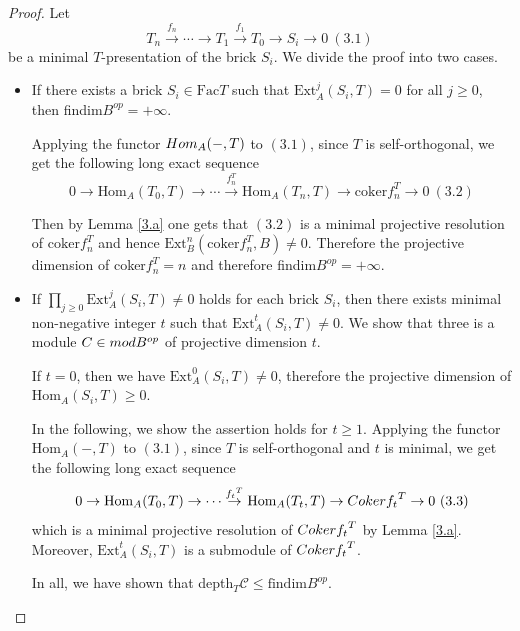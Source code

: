 \documentclass[10pt,a4paper]{amsart}
\begin{document}
\begin{proof}
 Let $$T_n \stackrel{f_n}{\to} \cdots \to T_1\stackrel{f_1} {\to} T_0 \to S_i \to 0\ (3.1)$$ be a minimal $T$-presentation of the brick $S_i$. We divide the proof into two cases.

\begin{itemize}
  \item [(1)] If there exists a brick $S_i \in \text{Fac}T$ such that $\text{Ext}^j_A (S_i, T) =0$ for all $j\geq 0$, then  findim$ B^{op}=+\infty$.

Applying the functor ${\rm Hom}_A(-, T)$ to $(3.1)$, since $T$ is self-orthogonal, we get the  following long exact sequence
$$0\to \text{Hom}_A(T_0, T)\to \cdots \xrightarrow{f_n^T} \text{Hom}_A(T_n, T)\to \text{coker} f_n ^T \to 0 \ (3.2)$$

\noindent Then by Lemma \ref{3.a} one gets that $(3.2)$ is a minimal projective resolution of $\text{coker} f_n ^T$ and hence $\text{Ext} _B^n (\text{coker}f_n^T, B) \neq 0$. Therefore the projective dimension of coker$f_n^T =n$ and therefore findim$B^{op}= +\infty.$

\item [(2)]  If $\prod _{j\geq 0}\text{Ext} _A^{j} (S_i, T) \neq 0$ holds for each brick $S_i$, then there exists minimal non-negative integer $t$ such that $\text{Ext}^t_A(S_i, T) \neq 0$. We show that three is a module $C\in {\rm mod}B^{op}$ of projective dimension $t$.

If $t=0$, then we have $\text{Ext}^0_A(S_i, T) \neq 0$, therefore the projective dimension of $\text{Hom}_A(S_i, T) \geq 0$.

In the following, we show the assertion holds for $t\geq1$. Applying the functor $\text{Hom}_A(-, T)$ to  $(3.1)$, since $T$ is self-orthogonal and $t$ is minimal, we get the following long exact sequence
$$0\to \text{Hom}_A(T_0, T)\to\cdots \stackrel{{f_t}^T}{\to} \text{Hom}_A(T_t, T)\to \textup{Coker}{f_t}^T \to 0\ (3.3)$$
 which is a minimal projective resolution of $\textup{Coker}{f_t}^T$ by Lemma \ref{3.a}. Moreover, $\text{Ext}^t_A(S_i, T)$ is a submodule of $\textup{Coker}{f_t}^T$. 
 
 In all, we have shown that depth$_T \mathcal{C} \leq \text{findim}B^{op}$.\qedhere
\end{itemize}\noindent
\end{proof}
\end{document}
